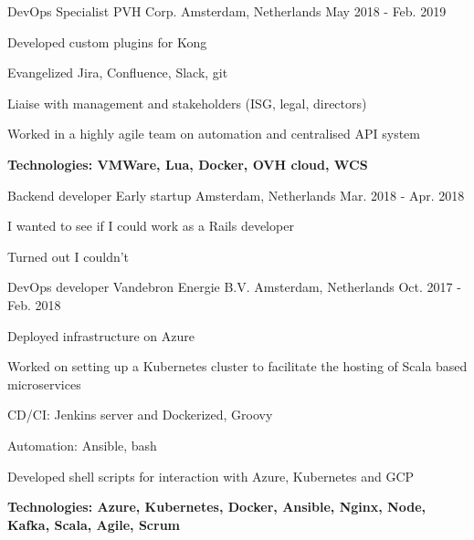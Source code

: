 \begin{cventries}
\cventry
{DevOps Specialist} %
{PVH Corp.} %
{Amsterdam, Netherlands} %
{May 2018 - Feb. 2019} %
{ %
	\begin{cvitems}
		\item {Developed custom plugins for Kong}
		\item {Evangelized Jira, Confluence, Slack, git}
		\item {Liaise with management and stakeholders (ISG, legal, directors)}
		\item {Worked in a highly agile team on automation and centralised API system}
		\item {\bfseries{Technologies:} VMWare, Lua, Docker, OVH cloud, WCS}
	\end{cvitems}
}

\cventry
{Backend developer} %
{Early startup} %
{Amsterdam, Netherlands} %
{Mar. 2018 - Apr. 2018} %
{ %
\begin{cvitems}
\item {I wanted to see if I could work as a Rails developer}
\item {Turned out I couldn't}
\end{cvitems}
}


\cventry
{DevOps developer} %
{Vandebron Energie B.V.} %
{Amsterdam, Netherlands} %
{Oct. 2017 - Feb. 2018} %
{ %
\begin{cvitems}
\item {Deployed infrastructure on Azure}
\item {Worked on setting up a Kubernetes cluster to facilitate the hosting of Scala based microservices}
\item {CD/CI: Jenkins server and Dockerized, Groovy}
\item {Automation: Ansible, bash}
\item {Developed shell scripts for interaction with Azure, Kubernetes and GCP}
\item {\bfseries{Technologies:} Azure, Kubernetes, Docker, Ansible, Nginx, Node, Kafka, Scala, Agile, Scrum}
\end{cvitems}
}



\end{cventries}
